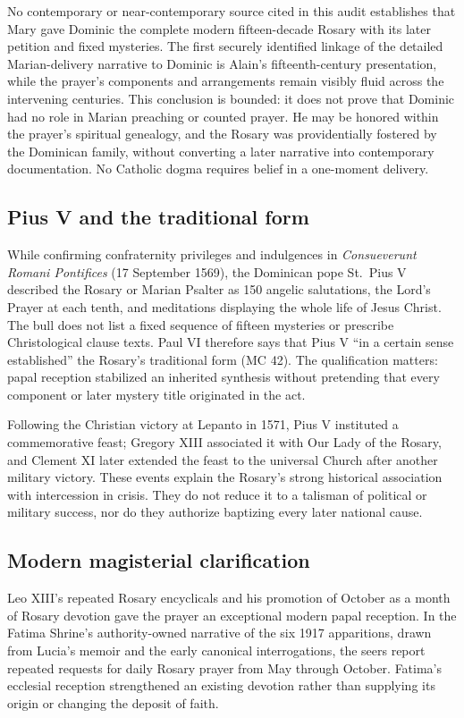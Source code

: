 No contemporary or near-contemporary source cited in this audit establishes that Mary gave Dominic the complete modern fifteen-decade Rosary with its later petition and fixed mysteries. The first securely identified linkage of the detailed Marian-delivery narrative to Dominic is Alain's fifteenth-century presentation, while the prayer's components and arrangements remain visibly fluid across the intervening centuries. This conclusion is bounded: it does not prove that Dominic had no role in Marian preaching or counted prayer. He may be honored within the prayer's spiritual genealogy, and the Rosary was providentially fostered by the Dominican family, without converting a later narrative into contemporary documentation. No Catholic dogma requires belief in a one-moment delivery.

\subsection{Pius V and the traditional form}

While confirming confraternity privileges and indulgences in \emph{Consueverunt Romani Pontifices} (17 September 1569), the Dominican pope St.~Pius V described the Rosary or Marian Psalter as 150 angelic salutations, the Lord's Prayer at each tenth, and meditations displaying the whole life of Jesus Christ. The bull does not list a fixed sequence of fifteen mysteries or prescribe Christological clause texts. Paul VI therefore says that Pius V ``in a certain sense established'' the Rosary's traditional form (MC 42). The qualification matters: papal reception stabilized an inherited synthesis without pretending that every component or later mystery title originated in the act.

Following the Christian victory at Lepanto in 1571, Pius V instituted a commemorative feast; Gregory XIII associated it with Our Lady of the Rosary, and Clement XI later extended the feast to the universal Church after another military victory. These events explain the Rosary's strong historical association with intercession in crisis. They do not reduce it to a talisman of political or military success, nor do they authorize baptizing every later national cause.

\subsection{Modern magisterial clarification}

Leo XIII's repeated Rosary encyclicals and his promotion of October as a month of Rosary devotion gave the prayer an exceptional modern papal reception. In the Fatima Shrine's authority-owned narrative of the six 1917 apparitions, drawn from Lucia's memoir and the early canonical interrogations, the seers report repeated requests for daily Rosary prayer from May through October. Fatima's ecclesial reception strengthened an existing devotion rather than supplying its origin or changing the deposit of faith.

